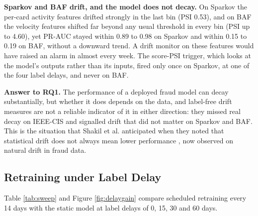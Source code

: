 \textbf{Sparkov and BAF drift, and the model does not decay.} On Sparkov the per-card activity features drifted strongly in the last bin (PSI 0.53), and on BAF the velocity features shifted far beyond any usual threshold in every bin (PSI up to 4.60), yet PR-AUC stayed within 0.89 to 0.98 on Sparkov and within 0.15 to 0.19 on BAF, without a downward trend. A drift monitor on these features would have raised an alarm in almost every week. The score-PSI trigger, which looks at the model's outputs rather than its inputs, fired only once on Sparkov, at one of the four label delays, and never on BAF.

\textbf{Answer to RQ1.} The performance of a deployed fraud model can decay substantially, but whether it does depends on the data, and label-free drift measures are not a reliable indicator of it in either direction: they missed real decay on IEEE-CIS and signalled drift that did not matter on Sparkov and BAF. This is the situation that Shakil et al. anticipated when they noted that statistical drift does not always mean lower performance \cite{shakil2025}, now observed on natural drift in fraud data.

\subsection{Retraining under Label Delay}\label{sec:rq2}

Table \ref{tab:sweep} and Figure \ref{fig:delaygain} compare scheduled retraining every 14 days with the static model at label delays of 0, 15, 30 and 60 days.

